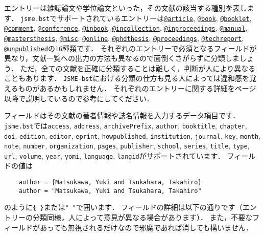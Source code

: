 \documentclass[a4paper,fleqn,uplatex,dvipdfmx]{jsarticle}
\makeatletter
\newcommand{\jsmefile}{\texttt{jsme.bst}}
\newcommand{\JSMErepos}{\texttt{JSME-bst}}
\newcommand{\ttarticle}{\texttt{@article}}
\newcommand{\ttbook}{\texttt{@book}}
\newcommand{\ttbooklet}{\texttt{@booklet}}
\newcommand{\ttcomment}{\texttt{@comment}}
\newcommand{\ttconference}{\texttt{@conference}}
\newcommand{\ttinbook}{\texttt{@inbook}}
\newcommand{\ttincollection}{\texttt{@incollection}}
\newcommand{\ttinproceedings}{\texttt{@inproceedings}}
\newcommand{\ttmanual}{\texttt{@manual}}
\newcommand{\ttmastersthesis}{\texttt{@mastersthesis}}
\newcommand{\ttmisc}{\texttt{@misc}}
\newcommand{\ttonline}{\texttt{@online}}
\newcommand{\ttphdthesis}{\texttt{@phdthesis}}
\newcommand{\ttproceedings}{\texttt{@proceedings}}
\newcommand{\tttechreport}{\texttt{@techreport}}
\newcommand{\ttunpublished}{\texttt{@unpublished}}
\makeatother
\begin{document}
エントリーは雑誌論文や学位論文といった，その文献の該当する種別を表します．
\jsmefile でサポートされているエントリーは\hyperref[ssec:article]{\ttarticle}, \hyperref[ssec:book]{\ttbook}, \hyperref[ssec:booklet]{\ttbooklet}, \hyperref[ssec:comment]{\ttcomment}, \hyperref[ssec:conference]{\ttconference}, \hyperref[ssec:inbook]{\ttinbook}, \hyperref[ssec:incollection]{\ttincollection}, \hyperref[ssec:inproceedings]{\ttinproceedings}, \hyperref[ssec:manual]{\ttmanual}, \hyperref[ssec:mastersthesis]{\ttmastersthesis}, \hyperref[ssec:misc]{\ttmisc}, \hyperref[ssec:online]{\ttonline}, \hyperref[ssec:phdthesis]{\ttphdthesis}, \hyperref[ssec:proceedings]{\ttproceedings}, \hyperref[ssec:techreport]{\tttechreport}, \hyperref[ssec:unpublished]{\ttunpublished}の16種類です．
それぞれのエントリーで必須となるフィールドが異なり，文献一覧への出力の方法も異なるので面倒くさがらずに分類しましょう．
ただ，全ての文献を正確に分類することは難しく，判断が人により異なることもあります．
\JSMErepos における分類の仕方も見る人によっては違和感を覚えるものがあるかもしれません．
それぞれのエントリーに関する詳細を\pageref{ssec:article}ページ以降で説明しているので参考にしてください．

フィールドはその文献の著者情報や誌名情報を入力するデータ項目です．
\jsmefile では\verb|access|, \verb|address|, \verb|archivePrefix|, \verb|author|, \verb|booktitle|, \verb|chapter|, \verb|doi|, \verb|edition|, \verb|editor|, \verb|eprint|, \verb|howpublished|, \verb|institution|, \verb|journal|, \verb|key|, \verb|month|, \verb|note|, \verb|number|, \verb|organization|, \verb|pages|, \verb|publisher|, \verb|school|, \verb|series|, \verb|title|, \verb|type|, \verb|url|, \verb|volume|, \verb|year|, \verb|yomi|, \verb|language|, \verb|langid|がサポートされています．
フィールドの値は
\begin{verbatim}
    author = {Matsukawa, Yuki and Tsukahara, Takahiro}
    author = "Matsukawa, Yuki and Tsukahara, Takahiro"
\end{verbatim}
のように\verb|{ }|または\verb|" "|で囲います．
フィールドの詳細は以下の通りです（エントリーの分類同様，人によって意見が異なる場合があります）．
また，不要なフィールドがあっても無視されるだけなので邪魔であれば消しても構いません．
\end{document}
